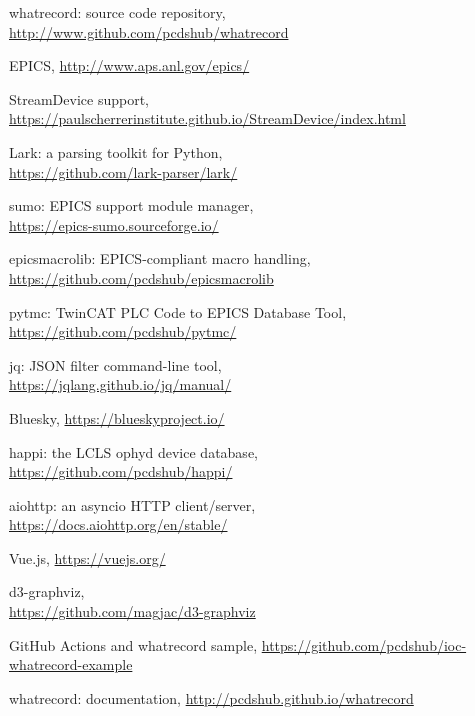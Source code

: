\documentclass[letter,
               keeplastbox,   %
               ]{jacow}
\begin{document}
%
	{\printbibliography}%
	{%
	
	\begin{thebibliography}{99} %
	
    	whatrecord: source code repository,\\
		\url{http://www.github.com/pcdshub/whatrecord}
	
		EPICS,
		\url{http://www.aps.anl.gov/epics/}
	
		StreamDevice support,\\
		\url{https://paulscherrerinstitute.github.io/StreamDevice/index.html}
	
		Lark: a parsing toolkit for Python,\\
		\url{https://github.com/lark-parser/lark/}
	
		sumo: EPICS support module manager,\\
		\url{https://epics-sumo.sourceforge.io/}
	
    	epicsmacrolib: EPICS-compliant macro handling,\\
		\url{https://github.com/pcdshub/epicsmacrolib}
	
   		pytmc: TwinCAT PLC Code to EPICS Database Tool,\\
		\url{https://github.com/pcdshub/pytmc/}

		jq: JSON filter command-line tool,\\
		\url{https://jqlang.github.io/jq/manual/}
	
    Bluesky,
		\url{https://blueskyproject.io/}
	
    happi: the LCLS ophyd device database,\\
    \url{https://github.com/pcdshub/happi/}

		aiohttp: an asyncio HTTP client/server,\\
		\url{https://docs.aiohttp.org/en/stable/}
	
    Vue.js,
		\url{https://vuejs.org/}
	
    d3-graphviz,\\
		\url{https://github.com/magjac/d3-graphviz}
	
		GitHub Actions and whatrecord sample,
		\url{https://github.com/pcdshub/ioc-whatrecord-example}
	
    	whatrecord: documentation,
		\url{http://pcdshub.github.io/whatrecord}
	
	\end{thebibliography}
} %

%
% 

\end{document}
